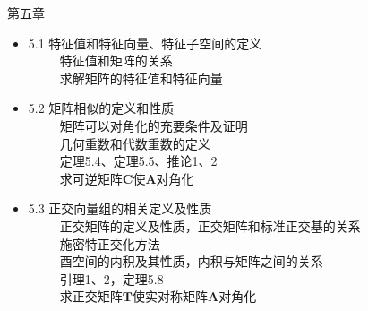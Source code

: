 \documentclass[compress,mathserif,cjk]{beamer}
\theoremstyle{remark}
\numberwithin{equation}{section}
\newcommand{\xiaoerhao}{\fontsize{18pt}{\baselineskip}\selectfont}  %
\begin{document}
\begin{CJK}{UTF8}{gbsn}
\begin{frame}{第五章}
\begin{itemize}
  \item 5.1 特征值和特征向量、特征子空间的定义\\
  \ \ \ \ \ 特征值和矩阵的关系\\
  \ \ \ \ \ 求解矩阵的特征值和特征向量
  \item 5.2 矩阵相似的定义和性质\\
  \ \ \ \ \ 矩阵可以对角化的充要条件及证明\\
  \ \ \ \ \ 几何重数和代数重数的定义\\
  \ \ \ \ \ 定理5.4、定理5.5、推论1、2\\
  \ \ \ \ \ 求可逆矩阵$\bm C$使$\bm A$对角化
  \item 5.3 正交向量组的相关定义及性质\\
  \ \ \ \ \ 正交矩阵的定义及性质，正交矩阵和标准正交基的关系\\
  \ \ \ \ \ 施密特正交化方法\\
   \ \ \ \ \ 酉空间的内积及其性质，内积与矩阵之间的关系\\
   \ \ \ \ \ 引理1、2，定理5.8\\
   \ \ \ \ \ 求正交矩阵$\bm T$使实对称矩阵$\bm A$对角化
\end{itemize}
\end{frame}




\begin{frame}
\begin{center}
{\textcolor[rgb]{0.50,0.00,1.00}{\textbf{\xiaoerhao{Thanks for your attention!}}}}\bigskip
\end{center}
\end{frame}
\end{CJK}
\end{document}
